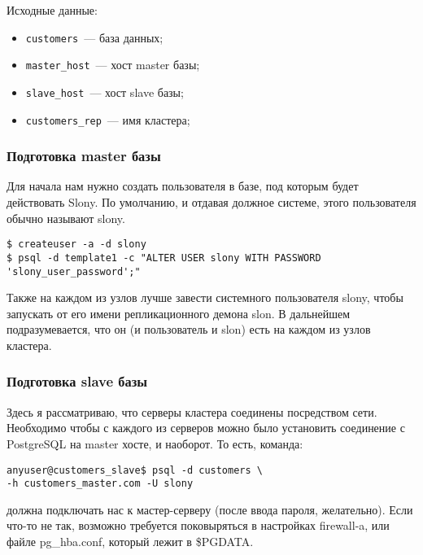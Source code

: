 Исходные данные:

\begin{itemize}
  \item \lstinline!customers!~--- база данных;
  \item \lstinline!master_host!~--- хост master базы;
  \item \lstinline!slave_host!~--- хост slave базы;
  \item \lstinline!customers_rep!~--- имя кластера;
\end{itemize}

\subsubsection{Подготовка master базы}

Для начала нам нужно создать пользователя в базе, под которым будет действовать Slony. По умолчанию, и отдавая должное системе, этого пользователя обычно называют slony.

\begin{lstlisting}[label=lst:slony2,caption=Подготовка master-сервера]
$ createuser -a -d slony
$ psql -d template1 -c "ALTER USER slony WITH PASSWORD 'slony_user_password';"
\end{lstlisting}

Также на каждом из узлов лучше завести системного пользователя slony, чтобы запускать от его имени репликационного демона slon. В дальнейшем подразумевается, что он (и пользователь и slon) есть на каждом из узлов кластера.

\subsubsection{Подготовка slave базы}

Здесь я рассматриваю, что серверы кластера соединены посредством сети. Необходимо чтобы с каждого из серверов можно было установить соединение с PostgreSQL на master хосте, и наоборот. То есть, команда:

\begin{lstlisting}[label=lst:slony3,caption=Подготовка одного slave-сервера]
anyuser@customers_slave$ psql -d customers \
-h customers_master.com -U slony
\end{lstlisting}

должна подключать нас к мастер-серверу (после ввода пароля, желательно). Если что-то не так, возможно требуется поковыряться в настройках firewall-a, или файле pg\_hba.conf, который лежит в \$PGDATA.

